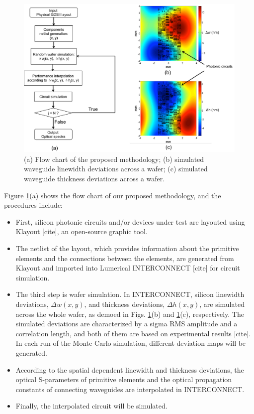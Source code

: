 \begin{figure}[h]
    \centering
    \label{flow_chart}\includegraphics[width=13cm]{flow_chart.pdf}
    \vspace{-10pt}
    \caption{(a) Flow chart of the proposed methodology; (b) simulated waveguide linewidth deviations across a wafer; (c) simulated waveguide thickness deviations across a wafer.}
    \label{flow_chart}  
\end{figure}

Figure \ref{flow_chart}(a) shows the flow chart of our proposed methodology, and the procedures include: 
\begin{itemize}
\item First, silicon photonic circuits and/or devices under test are layouted using Klayout [cite], an open-source graphic tool. 
\item
The netlist of the layout, which provides information about the primitive elements and the connections between the elements, are generated from Klayout and imported into Lumerical INTERCONNECT [cite] for circuit simulation. 
\item
The third step is wafer simulation. In INTERCONNECT, silicon linewidth deviations, $\Delta w(x,y)$, and thickness deviations, $\Delta h(x,y)$, are simulated across the whole wafer, as demoed in Figs. \ref{flow_chart}(b) and \ref{flow_chart}(c), respectively. The simulated deviations are characterized by a sigma RMS amplitude and a correlation length, and both of them are based on experimental results [cite]. In each run of the Monte Carlo simulation, different deviation maps will be generated. 
\item
According to the spatial dependent linewidth and thickness deviations, the optical S-parameters of primitive elements and the optical propagation constants of connecting waveguides are interpolated in INTERCONNECT. 
\item
Finally, the interpolated circuit will be simulated. 
\end{itemize}

